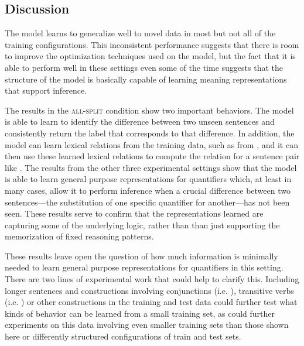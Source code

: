 \subsection{Discussion} 


The model learns to generalize well to novel data in most but not all of the training configurations. This inconsistent performance suggests that there is room to improve the optimization techniques used on the model, but the fact that it is able to perform well in these settings even some of the time suggests that the structure of the model is basically capable of learning meaning representations that support inference.

The results in the \textsc{all-split} condition show two important behaviors. The model is able to learn to identify the difference between two unseen sentences and consistently return the label that corresponds to that difference. In addition, the model can learn lexical relations from the training data, such as  from , and it can then use these learned lexical relations to compute the relation for a sentence pair like . The results from the other three experimental settings show that the model is able to learn general purpose representations for quantifiers which, at least in many cases, allow it to perform inference when a crucial difference between two sentences---the  substitution of one specific quantifier for another---has not been seen. These results serve to confirm that the representations learned are capturing some of the underlying logic, rather than than just supporting the memorization of fixed reasoning patterns. 


These results leave open the question of how much information is minimally needed to learn general purpose representations for quantifiers in this setting. There are two lines of experimental work that could help to clarify this. Including longer sentences and constructions involving conjunctions (i.e. ), transitive verbs (i.e. ) or other constructions in the training and test data could further test what kinds of behavior can be learned from a small training set, as could further experiments on this data involving even smaller training sets than those shown here or differently structured configurations of train and test sets.


